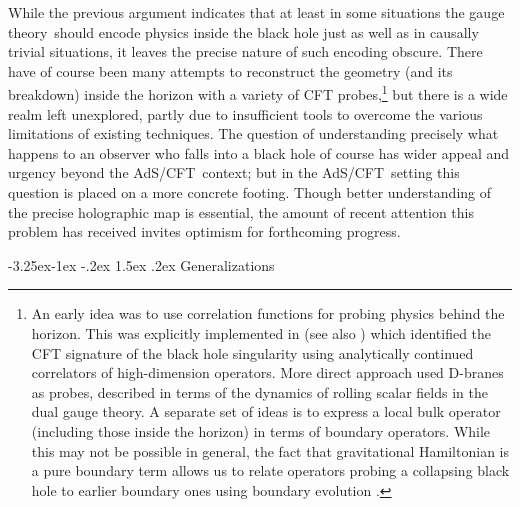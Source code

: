 \documentclass[12pt]{article}
\makeatletter
\renewcommand\subsection{\@startsection{subsection}{2}{\z@}%
                                     {-3.25ex\@plus -1ex \@minus -.2ex}%
                                     {1.5ex \@plus .2ex}%
                                     {\normalfont\bfseries}}
\def\AC{AdS/CFT}
\def\GT{gauge theory}
\makeatother
\begin{document}
While the previous argument indicates that at least in some situations the \GT\ should encode physics inside the black hole just as well as in causally trivial situations, it leaves the precise nature of such encoding obscure.  There have of course been many attempts to reconstruct the geometry (and its breakdown) inside the horizon with a variety of CFT probes,\footnote{
An early idea \cite{Balasubramanian:1999zv} was to use correlation functions for probing physics behind the horizon.  This was explicitly implemented in \cite{Fidkowski:2003nf} (see also \cite{Festuccia:2005pi}) which identified the CFT signature of the black hole singularity using analytically continued correlators of high-dimension operators. 
More direct approach  \cite{Horowitz:2009wm} used D-branes as probes, described in terms of the dynamics of rolling scalar fields in the dual \GT.
A separate set of ideas \cite{Hamilton:2006fh} is to express a local bulk operator (including those inside the horizon) in terms of boundary operators.  While this may not be possible in general, the fact that gravitational Hamiltonian is a pure boundary term allows us to relate operators probing a collapsing black hole to earlier boundary ones using boundary evolution \cite{Marolf:2008mf}.
}
but there is a wide realm left unexplored, partly due to insufficient tools to overcome the various limitations of existing techniques.  The question of understanding precisely what happens to an observer who falls into a black hole of course has wider appeal and urgency beyond the \AC\ context; but in the \AC\ setting this question is placed on a more concrete footing.  Though better understanding of the precise holographic map is essential, the amount of recent attention this problem has received invites optimism for forthcoming progress.

\subsection{Generalizations}
\label{s:generalizations}
\end{document}
